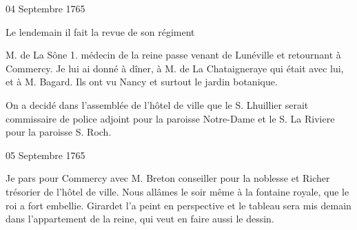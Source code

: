                      \begin{diary}{04 Septembre 1765}{}
                        
                         Le lendemain il fait la revue de son régiment
                        \bigskip
        
        
                        
                           M. de La Sône 1. médecin de la
                              reine passe
                           venant de Lunéville et
                           retournant à Commercy.
                           Je lui ai donné à dîner, à M. de La
                              Chataigneraye
                           qui était avec lui, et à M.
                              Bagard. Ils ont
                           vu Nancy et surtout
                              le jardin botanique. \bigskip
        
        
                         On a decidé dans l'assemblée de
                              l'hôtel de
                              ville que le S.
                              Lhuillier serait commissaire de police
                           adjoint pour la paroisse
                              Notre-Dame et le S. La
                              Riviere
                           pour la paroisse S. Roch. \bigskip
        
        
                     \end{diary}

                     \begin{diary}{05 Septembre 1765}{}
                        
                         Je pars pour Commercy avec M.
                              Breton
                           conseiller pour la noblesse et Richer
                           trésorier de
                           l'hôtel de ville. Nous allâmes le
                           soir même
                           à la fontaine royale, que le
                              roi a fort embellie. Girardet l'a peint en
                           perspective
                           et le tableau sera mis demain dans l'appartement
                           de la reine, qui veut
                           en faire aussi le dessin. \bigskip
        
        
                     \end{diary}

